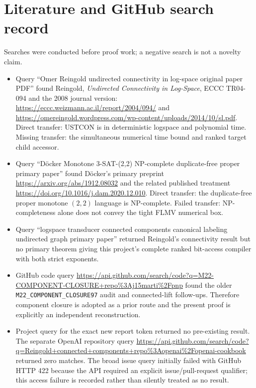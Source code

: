 \documentclass[11pt]{article}
\begin{document}
\section{Literature and GitHub search record}
Searches were conducted before proof work; a negative search is not a novelty
claim.
\begin{itemize}
  \item Query ``Omer Reingold undirected connectivity in log-space original
  paper PDF'' found Reingold, \emph{Undirected Connectivity in Log-Space}, ECCC
  TR04-094 and the 2008 journal version:
  \url{https://eccc.weizmann.ac.il/report/2004/094/} and
  \url{https://omereingold.wordpress.com/wp-content/uploads/2014/10/sl.pdf}.
  Direct transfer: USTCON is in deterministic logspace and polynomial time.
  Missing transfer: the simultaneous numerical time bound and ranked target
  child accessor.
  \item Query ``Döcker Monotone 3-SAT-(2,2) NP-complete duplicate-free proper
  primary paper'' found Döcker's primary preprint
  \url{https://arxiv.org/abs/1912.08032} and the related published treatment
  \url{https://doi.org/10.1016/j.dam.2020.12.010}.  Direct transfer: the
  duplicate-free proper monotone $(2,2)$ language is NP-complete.  Failed
  transfer: NP-completeness alone does not convey the tight FLMV numerical box.
  \item Query ``logspace transducer connected components canonical labeling
  undirected graph primary paper'' returned Reingold's connectivity result but
  no primary theorem giving this project's complete ranked bit-access compiler
  with both strict exponents.
  \item GitHub code query
  \url{https://api.github.com/search/code?q=M22-COMPONENT-CLOSURE+repo%3Aj15marti%2Fpnp}
  found the older \texttt{M22\_COMPONENT\_CLOSURE97} audit and connected-lift
  follow-ups.  Therefore component closure is adopted as a prior route and the
  present proof is explicitly an independent reconstruction.
  \item Project query for the exact new report token returned no pre-existing
  result.  The separate OpenAI repository query
  \url{https://api.github.com/search/code?q=Reingold+connected+components+repo%3Aopenai%2Fopenai-cookbook}
  returned zero matches.  The broad issue query initially failed with GitHub
  HTTP 422 because the API required an explicit issue/pull-request qualifier;
  this access failure is recorded rather than silently treated as no result.
\end{itemize}
\end{document}
